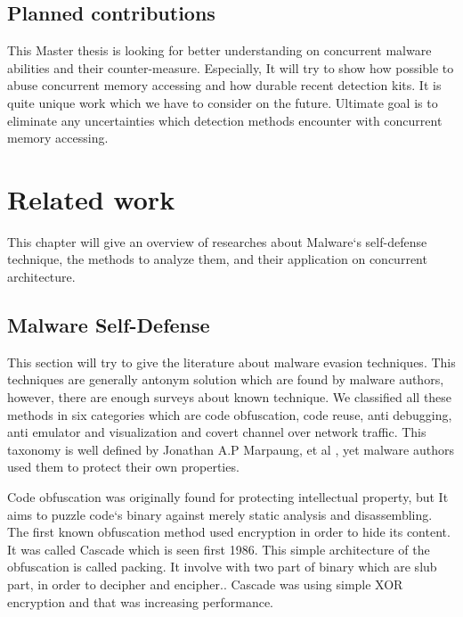 \subsection{Planned contributions}
This Master thesis is looking for better understanding on concurrent malware abilities and their counter-measure. Especially, It will try to show how possible to abuse concurrent memory accessing and how durable recent detection kits. It is quite unique work which we have to consider on the future. Ultimate goal is to eliminate any uncertainties which detection methods encounter with concurrent memory accessing.

\section{Related work}
This chapter will give an overview of researches about Malware`s self-defense technique, the methods to analyze them, and their application on concurrent architecture. 

\subsection{Malware Self-Defense}
This section will try to give the literature about malware evasion techniques. This techniques are generally antonym solution which are found by malware authors, however, there are enough surveys about known technique. We classified all these methods in six categories which are code obfuscation, code reuse, anti debugging, anti emulator and visualization and covert channel over network traffic. This taxonomy is well defined by Jonathan A.P Marpaung, et al \cite{marpaung2012survey}, yet malware authors used them to protect their own properties. 


Code obfuscation was originally  found for protecting intellectual property\cite{balakrishnan2005code}, but It aims to puzzle code`s binary against merely static analysis and disassembling\cite{nachenberg1996understanding}. The first known obfuscation method used encryption in order to hide its content. It was called Cascade which is seen first 1986\cite{you2010malware}. This simple architecture of the obfuscation is called packing\cite{internotsecurityteam}. It involve with two part of binary which are slub part, in order to decipher and encipher.\cite{marpaung2012survey}. Cascade was using simple XOR encryption and that was increasing performance.

